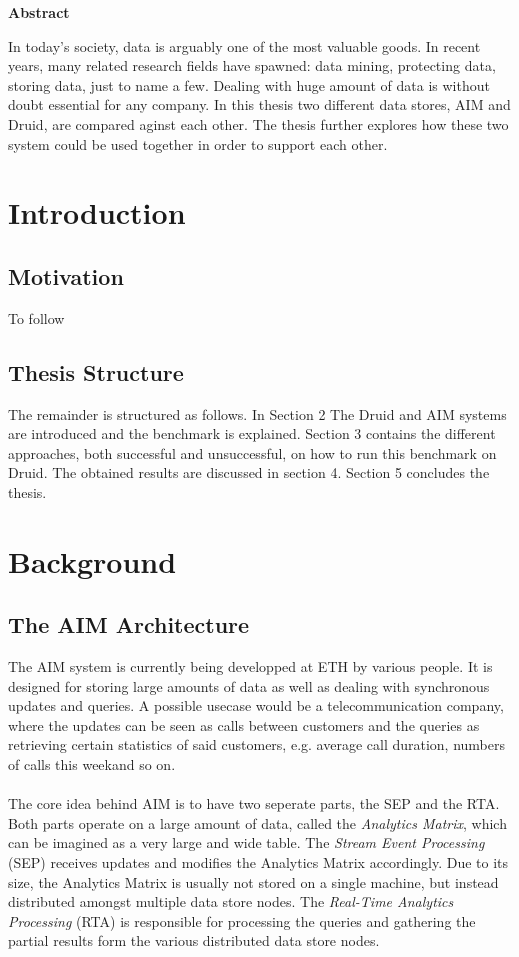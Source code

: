 \documentclass[11pt,singlecolumn]{scrartcl}
\begin{document}
\hspace{60mm}
\begin{center}
 \textbf{Abstract} \end{center}


In today's society, data is arguably one of the most valuable goods. In recent years, many related research fields have  spawned: data mining, protecting data, storing data, just to name a few. Dealing with huge amount of data is without doubt essential for any company. In this thesis two different data stores, AIM and Druid, are compared aginst each other. The thesis further explores how these two system could be used together in order to support each other.


\clearpage
\tableofcontents
\clearpage
\section{Introduction}
\subsection{Motivation}
To follow

\subsection{Thesis Structure}
The remainder is structured as follows. In Section 2 The Druid and AIM systems are introduced and the benchmark is explained. Section 3 contains the different approaches, both successful and unsuccessful, on how to run this benchmark on Druid. The obtained results are discussed in section 4. Section 5 concludes the thesis.
\clearpage

\section{Background}
\subsection{The AIM Architecture}
The AIM system \cite{aim} is currently being developped at ETH by various people. It is designed for storing large amounts of data as well as dealing with synchronous updates and queries. A possible usecase would be a telecommunication company, where the updates can be seen as calls between customers and the queries as retrieving certain statistics of said customers, e.g. average call duration, numbers of calls this weekand so on.\\\\
The core idea  behind AIM is to have two seperate parts, the SEP and the RTA. Both parts operate on a large amount of data, called the \textit{Analytics Matrix}, which can be imagined as a very large and wide table. The \textit{Stream Event Processing} (SEP) receives updates and modifies the Analytics Matrix accordingly. Due to its size, the Analytics Matrix is usually not stored on a single machine, but instead distributed amongst multiple data store nodes. The \textit{Real-Time Analytics Processing} (RTA) is responsible for processing the queries and gathering the partial results form the various distributed data store nodes.
\end{document}
